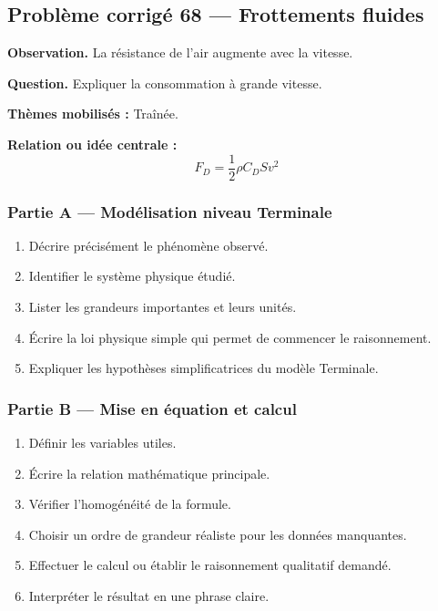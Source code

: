 \documentclass[11pt,a4paper]{article}
\begin{document}
\subsection{Problème corrigé 68 — Frottements fluides}

\begin{exercicebox}
\textbf{Observation.} La résistance de l'air augmente avec la vitesse.

\medskip
\textbf{Question.} Expliquer la consommation à grande vitesse.

\medskip
\textbf{Thèmes mobilisés :} Traînée.

\medskip
\textbf{Relation ou idée centrale :}
\[
F_D=\frac12\rho C_DSv^2
\]
\end{exercicebox}

\subsubsection*{Partie A — Modélisation niveau Terminale}

\begin{enumerate}
  \item Décrire précisément le phénomène observé.
  \item Identifier le système physique étudié.
  \item Lister les grandeurs importantes et leurs unités.
  \item Écrire la loi physique simple qui permet de commencer le raisonnement.
  \item Expliquer les hypothèses simplificatrices du modèle Terminale.
\end{enumerate}

\subsubsection*{Partie B — Mise en équation et calcul}

\begin{enumerate}
  \item Définir les variables utiles.
  \item Écrire la relation mathématique principale.
  \item Vérifier l'homogénéité de la formule.
  \item Choisir un ordre de grandeur réaliste pour les données manquantes.
  \item Effectuer le calcul ou établir le raisonnement qualitatif demandé.
  \item Interpréter le résultat en une phrase claire.
\end{enumerate}
\end{document}
